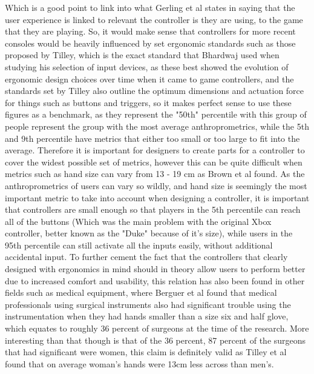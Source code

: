 \documentclass[journal]{IEEEtran}
\begin{document}
Which is a good point to link into what Gerling et al\cite{Gerling:2011:MIG:2181037.2181052} states in saying that the user experience is linked to relevant the controller is they are using, to the game that they are playing. So, it would make sense that controllers for more recent consoles would be heavily influenced by set ergonomic standards such as those proposed by Tilley\cite{tilley}, which is the exact standard that Bhardwaj\cite{omichands} used when studying his selection of input devices, as these best showed the evolution of ergonomic design choices over time when it came to game controllers, and the standards set by Tilley also outline the optimum dimensions and actuation force for things such as buttons and triggers, so it makes perfect sense to use these figures as a benchmark, as they represent the "50th" percentile\cite{omichands} with this group of people represent the group with the most average anthroprometrics, while the 5th and 9th percentile have metrics that either too small or too large to fit into the average. Therefore it is important for designers to create parts for a controller to cover the widest possible set of metrics\cite{heatherly2014video}, however this can be quite difficult when metrics such as hand size can vary from 13 - 19 cm as Brown et al found\cite{brown2013evaluating}. As the anthroprometrics of users can vary so wildly, and hand size is seemingly the most important metric to take into account when designing a controller, it is important that controllers are small enough so that players in the 5th percentile can reach all of the buttons (Which was the main problem with the original Xbox controller, better known as the "Duke" because of it's size\cite{omichands}), while users in the 95th percentile can still activate all the inputs easily, without additional accidental input. To further cement the fact that the controllers that clearly designed with ergonomics in mind should in theory allow users to perform better due to increased comfort and usability\cite{brown2013evaluating}, this relation has also been found in other fields such as medical equipment, where Berguer et al\cite{berguer2004relationship} found that medical professionals using surgical instruments also had significant trouble using the instrumentation when they had hands smaller than a size six and half glove, which equates to roughly 36 percent of surgeons at the time of the research. More interesting than that though is that of the 36 percent, 87 percent of the surgeons that had significant were women, this claim is definitely valid as Tilley et al found that on average woman's hands were 13cm less across than men's\cite{tilley}.
\end{document}
